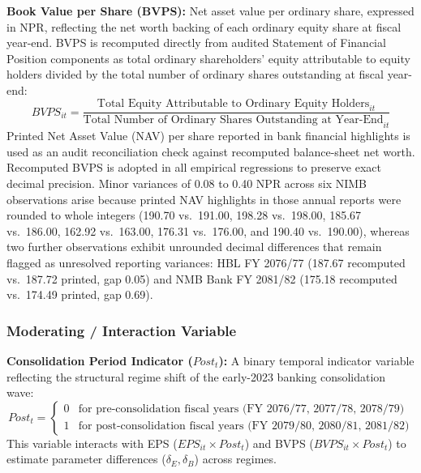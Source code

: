 \textbf{Book Value per Share (BVPS):}
Net asset value per ordinary share, expressed in NPR, reflecting the net worth backing of each ordinary equity share at fiscal year-end. BVPS is recomputed directly from audited Statement of Financial Position components as total ordinary shareholders' equity attributable to equity holders divided by the total number of ordinary shares outstanding at fiscal year-end:
\begin{equation}
\mathit{BVPS}_{it} = \frac{\text{Total Equity Attributable to Ordinary Equity Holders}_{it}}{\text{Total Number of Ordinary Shares Outstanding at Year-End}_{it}}
\label{eq:bvps_def}
\end{equation}
Printed Net Asset Value (NAV) per share reported in bank financial highlights is used as an audit reconciliation check against recomputed balance-sheet net worth. Recomputed BVPS is adopted in all empirical regressions to preserve exact decimal precision. Minor variances of 0.08 to 0.40 NPR across six NIMB observations arise because printed NAV highlights in those annual reports were rounded to whole integers (190.70 vs.\ 191.00, 198.28 vs.\ 198.00, 185.67 vs.\ 186.00, 162.92 vs.\ 163.00, 176.31 vs.\ 176.00, and 190.40 vs.\ 190.00), whereas two further observations exhibit unrounded decimal differences that remain flagged as unresolved reporting variances: HBL FY 2076/77 (187.67 recomputed vs.\ 187.72 printed, gap 0.05) and NMB Bank FY 2081/82 (175.18 recomputed vs.\ 174.49 printed, gap 0.69).

\subsubsection{Moderating / Interaction Variable}
\textbf{Consolidation Period Indicator ($\mathit{Post}_t$):}
A binary temporal indicator variable reflecting the structural regime shift of the early-2023 banking consolidation wave:
\begin{equation}
\mathit{Post}_t = \begin{cases} 0 & \text{for pre-consolidation fiscal years (FY 2076/77, 2077/78, 2078/79)} \\ 1 & \text{for post-consolidation fiscal years (FY 2079/80, 2080/81, 2081/82)} \end{cases}
\label{eq:post_def}
\end{equation}
This variable interacts with EPS ($\mathit{EPS}_{it} \times \mathit{Post}_t$) and BVPS ($\mathit{BVPS}_{it} \times \mathit{Post}_t$) to estimate parameter differences ($\delta_E, \delta_B$) across regimes.

